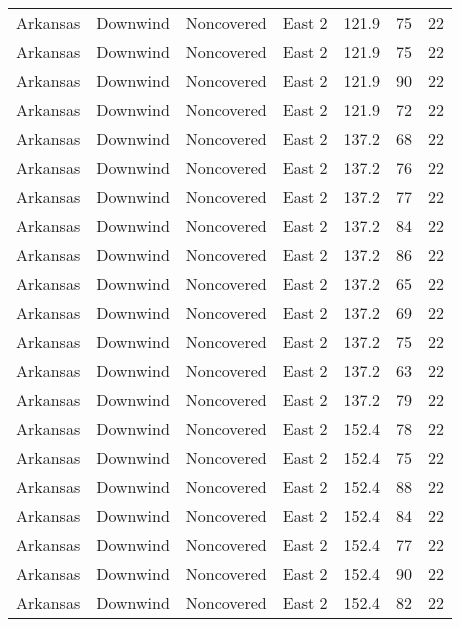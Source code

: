 \documentclass{article}
\begin{document}
\begin{longtable}[H]{ccccccc}
Arkansas & Downwind  & Noncovered & East 2        & 121.9        & 75          & 22  \\
Arkansas & Downwind  & Noncovered & East 2        & 121.9        & 75          & 22  \\
Arkansas & Downwind  & Noncovered & East 2        & 121.9        & 90          & 22  \\
Arkansas & Downwind  & Noncovered & East 2        & 121.9        & 72          & 22  \\
Arkansas & Downwind  & Noncovered & East 2        & 137.2        & 68          & 22  \\
Arkansas & Downwind  & Noncovered & East 2        & 137.2        & 76          & 22  \\
Arkansas & Downwind  & Noncovered & East 2        & 137.2        & 77          & 22  \\
Arkansas & Downwind  & Noncovered & East 2        & 137.2        & 84          & 22  \\
Arkansas & Downwind  & Noncovered & East 2        & 137.2        & 86          & 22  \\
Arkansas & Downwind  & Noncovered & East 2        & 137.2        & 65          & 22  \\
Arkansas & Downwind  & Noncovered & East 2        & 137.2        & 69          & 22  \\
Arkansas & Downwind  & Noncovered & East 2        & 137.2        & 75          & 22  \\
Arkansas & Downwind  & Noncovered & East 2        & 137.2        & 63          & 22  \\
Arkansas & Downwind  & Noncovered & East 2        & 137.2        & 79          & 22  \\
Arkansas & Downwind  & Noncovered & East 2        & 152.4        & 78          & 22  \\
Arkansas & Downwind  & Noncovered & East 2        & 152.4        & 75          & 22  \\
Arkansas & Downwind  & Noncovered & East 2        & 152.4        & 88          & 22  \\
Arkansas & Downwind  & Noncovered & East 2        & 152.4        & 84          & 22  \\
Arkansas & Downwind  & Noncovered & East 2        & 152.4        & 77          & 22  \\
Arkansas & Downwind  & Noncovered & East 2        & 152.4        & 90          & 22  \\
Arkansas & Downwind  & Noncovered & East 2        & 152.4        & 82          & 22  \\

\end{longtable}
\end{document}
